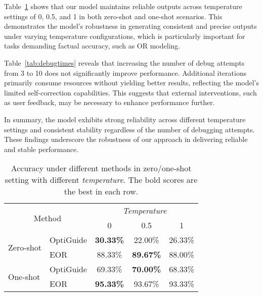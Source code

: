 Table~\ref{tab:temperature} shows that our model maintains reliable outputs across temperature settings of 0, 0.5, and 1 in both zero-shot and one-shot scenarios. This demonstrates the model's robustness in generating consistent and precise outputs under varying temperature configurations, which is particularly important for tasks demanding factual accuracy, such as OR modeling.

Table~\ref{tab:debugtimes} reveals that increasing the number of debug attempts from 3 to 10 does not significantly improve performance. Additional iterations primarily consume resources without yielding better results, reflecting the model's limited self-correction capabilities. This suggests that external interventions, such as user feedback, may be necessary to enhance performance further.

In summary, the model exhibits strong reliability across different temperature settings and consistent stability regardless of the number of debugging attempts. These findings underscore the robustness of our approach in delivering reliable and stable performance.

\begin{table}[ht]
\caption{Accuracy under different methods in zero/one-shot setting with different \textit{temperature}. The bold scores are the best in each row.}
\vspace{-8pt}
\label{tab:temperature}
\begin{center}
\begin{tabular}{c|l|c|c|c}
\toprule
\multicolumn{2}{c}{\multirow{2}{*}{Method}} & \multicolumn{3}{c}{\textit{Temperature}} \\
\cmidrule{3-5}
\multicolumn{2}{c}{} & 0 & 0.5 & 1 \\
\midrule
\multicolumn{1}{l|}{\multirow{2}{*}{Zero-shot}} & OptiGuide & \textbf{30.33\%} & 22.00\% & 26.33\% \\
\multicolumn{1}{c|}{} & EOR & 88.33\% & \textbf{89.67\%} & 88.00\% \\
\midrule
\multicolumn{1}{l|}{\multirow{2}{*}{One-shot}} & OptiGuide & 69.33\% & \textbf{70.00\%} & 68.33\% \\
\multicolumn{1}{c|}{} & EOR & \textbf{95.33\%} & 93.67\% & 93.33\% \\
\bottomrule
\end{tabular}
\end{center}
\vspace{-10pt}
\end{table}

